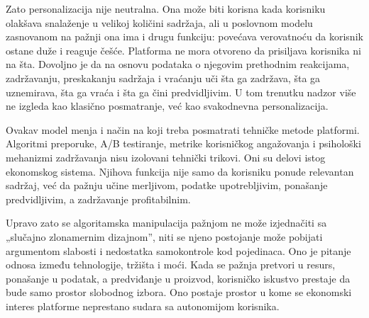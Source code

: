 Zato personalizacija nije neutralna. Ona može biti korisna kada korisniku olakšava snalaženje u velikoj količini sadržaja, ali u poslovnom modelu zasnovanom na pažnji ona ima i drugu funkciju: povećava verovatnoću da korisnik ostane duže i reaguje češće. Platforma ne mora otvoreno da prisiljava korisnika ni na šta. Dovoljno je da na osnovu podataka o njegovim prethodnim reakcijama, zadržavanju, preskakanju sadržaja i vraćanju uči šta ga zadržava, šta ga uznemirava, šta ga vraća i šta ga čini predvidljivim. U tom trenutku nadzor više ne izgleda kao klasično posmatranje, već kao svakodnevna personalizacija.

Ovakav model menja i način na koji treba posmatrati tehničke metode platformi. Algoritmi preporuke, A/B testiranje, metrike korisničkog angažovanja i psihološki mehanizmi zadržavanja nisu izolovani tehnički trikovi. Oni su delovi istog ekonomskog sistema. Njihova funkcija nije samo da korisniku ponude relevantan sadržaj, već da pažnju učine merljivom, podatke upotrebljivim, ponašanje predvidljivim, a zadržavanje profitabilnim.

Upravo zato se algoritamska manipulacija pažnjom ne može izjednačiti sa „slučajno zlonamernim dizajnom”, niti se njeno postojanje može pobijati argumentom slabosti i nedostatka samokontrole kod pojedinaca. Ono je pitanje odnosa između tehnologije, tržišta i moći. Kada se pažnja pretvori u resurs, ponašanje u podatak, a predviđanje u proizvod, korisničko iskustvo prestaje da bude samo prostor slobodnog izbora. Ono postaje prostor u kome se ekonomski interes platforme neprestano sudara sa autonomijom korisnika.